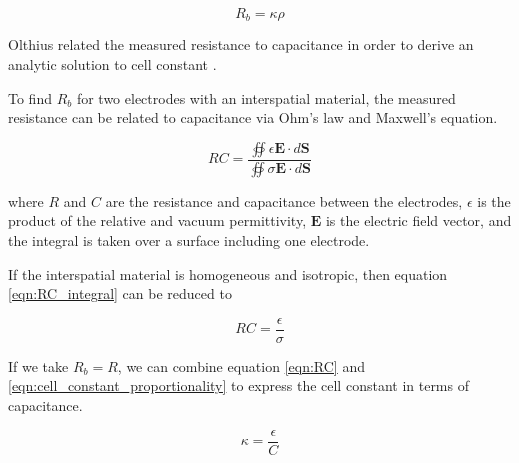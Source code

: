   \begin{equation}
      R_b = \kappa \rho
      \label{eqn:cell_constant_proportionality}
  \end{equation}
  
  \noindent  Olthius related the measured resistance to capacitance in order to derive an analytic solution to cell constant \cite{olthuis_theoretical_1995}. 
  
  \par To find $R_b$ for two electrodes with an interspatial material, the measured resistance can be related to capacitance via Ohm's law and Maxwell's equation.
  
  \begin{equation}
      RC = \frac{\oiint \epsilon \boldsymbol{E} \cdot d\boldsymbol{S}}{\oiint \sigma\boldsymbol{E}\cdot d\boldsymbol{S}}
      \label{eqn:RC_integral}
  \end{equation}
  
  \noindent where $R$ and $C$ are the resistance and capacitance between the electrodes, $\epsilon$ is the product of the relative and vacuum permittivity, $\boldsymbol{E}$ is the electric field vector, and the integral is taken over a surface including one electrode.
  
  \par If the interspatial material is homogeneous and isotropic, then equation \ref{eqn:RC_integral} can be reduced to
  
  \begin{equation}
      RC = \frac{\epsilon}{\sigma}
      \label{eqn:RC}
  \end{equation}
  
  \par If we take $R_b = R$, we can combine equation \ref{eqn:RC} and \ref{eqn:cell_constant_proportionality} to express the cell constant in terms of capacitance.
  
  \begin{equation}
      \kappa = \frac{\epsilon}{C}
      \label{eqn:cell_constant_C}
  \end{equation}
  
